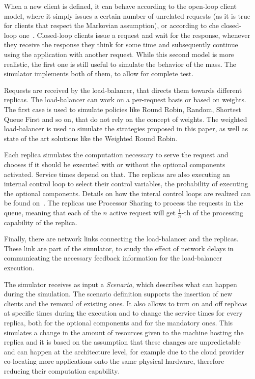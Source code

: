 When a new client is defined, it can behave according to the open-loop
client model, where it simply issues a certain number of unrelated
requests (as it is true for clients that respect the Markovian
assumption), or according to che closed-loop
one~\cite{openvsclosed}. Closed-loop clients issue a request and wait
for the response, whenever they receive the response they think for
some time and subsequently continue using the application with another
request. While this second model is more realistic, the first one is
still useful to simulate the behavior of the mass. The simulator
implements both of them, to allow for complete test.

Requests are received by the load-balancer, that directs them towards
different replicas. The load-balancer can work on a per-request basis
or based on weights. The first case is used to simulate policies like
Round Robin, Random, Shortest Queue First and so on, that do not rely
on the concept of weights. The weighted load-balancer is used to
simulate the strategies proposed in this paper, as well as state of
the art solutions like the Weighted Round Robin.

Each replica simulates the computation necessary to serve the request
and chooses if it should be executed with or without the optional
components activated. Service times depend on that. The replicas are
also executing an internal control loop to select their control
variables, the probability of executing the optional
components. Details on how the interal control loops are realized can
be found on~\cite{cloudish-tr}. The replicas use Processor Sharing to
process the requests in the queue, meaning that each of the $n$ active
request will get $\frac{1}{n}$-th of the processing capability of the
replica.

Finally, there are network links connecting the load-balancer and the
replicas. These link are part of the simulator, to study the effect of
network delays in communicating the necessary feedback information for
the load-balancer execution.

The simulator receives as input a \emph{Scenario}, which describes
what can happen during the simulation. The scenario definition
supports the insertion of new clients and the removal of existing
ones. It also allows to turn on and off replicas at specific times
during the execution and to change the service times for every
replica, both for the optional components and for the mandatory
ones. This simulates a change in the amount of resources given to the
machine hosting the replica and it is based on the assumption that
these changes are unpredictable and can happen at the architecture
level, for example due to the cloud provider co-locating more
applications onto the same physical hardware, therefore reducing their
computation capability.

